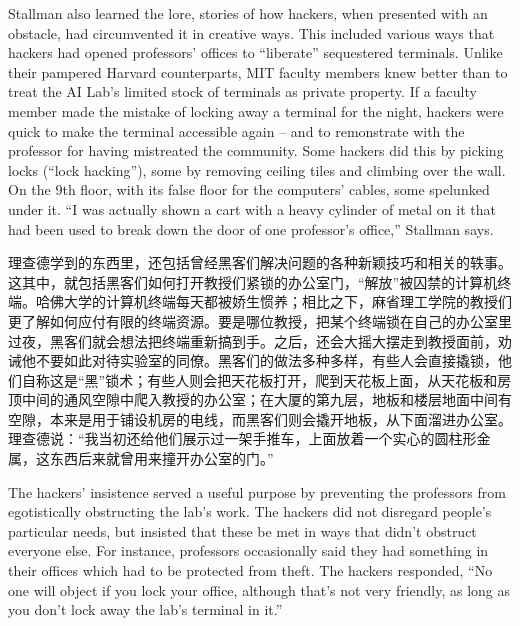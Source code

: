 \ifdefined\eng
Stallman also learned the lore, stories of how hackers, when presented with an obstacle, had circumvented it in creative ways. This included various ways that hackers had opened professors' offices to ``liberate'' sequestered terminals. Unlike their pampered Harvard counterparts, MIT faculty members knew better than to treat the AI Lab's limited stock of terminals as private property. If a faculty member made the mistake of locking away a terminal for the night, hackers were quick to make the terminal accessible again -- and to remonstrate with the professor for having mistreated the community.  Some hackers did this by picking locks (``lock hacking''), some by removing ceiling tiles and climbing over the wall.  On the 9th floor, with its false floor for the computers' cables, some spelunked under it.  ``I was actually shown a cart with a heavy cylinder of metal on it that had been used to break down the door of one professor's office,'' Stallman says.
\fi

\ifdefined\chs
理查德学到的东西里，还包括曾经黑客们解决问题的各种新颖技巧和相关的轶事。这其中，就包括黑客们如何打开教授们紧锁的办公室门，“解放”被囚禁的计算机终端。哈佛大学的计算机终端每天都被娇生惯养；相比之下，麻省理工学院的教授们更了解如何应付有限的终端资源。要是哪位教授，把某个终端锁在自己的办公室里过夜，黑客们就会想法把终端重新搞到手。之后，还会大摇大摆走到教授面前，劝诫他不要如此对待实验室的同僚。黑客们的做法多种多样，有些人会直接撬锁，他们自称这是“黑”锁术；有些人则会把天花板打开，爬到天花板上面，从天花板和房顶中间的通风空隙中爬入教授的办公室；在大厦的第九层，地板和楼层地面中间有空隙，本来是用于铺设机房的电线，而黑客们则会撬开地板，从下面溜进办公室。理查德说：“我当初还给他们展示过一架手推车，上面放着一个实心的圆柱形金属，这东西后来就曾用来撞开办公室的门。”
\fi

\ifdefined\eng
The hackers' insistence served a useful purpose by preventing the professors from egotistically obstructing the lab's work.  The hackers did not disregard people's particular needs, but insisted that these be met in ways that didn't obstruct everyone else.  For instance, professors occasionally said they had something in their offices which had to be protected from theft.  The hackers responded, ``No one will object if you lock your office, although that's not very friendly, as long as you don't lock away the lab's terminal in it.''
\fi


